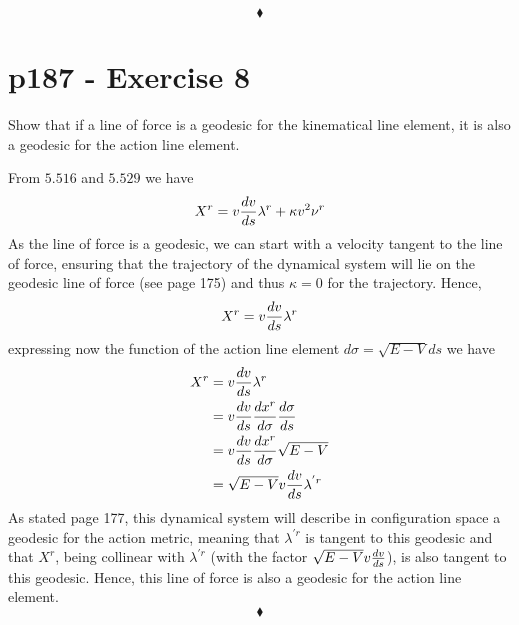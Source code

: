 $$\blacklozenge$$
\newpage


\section{p187 - Exercise 8}
\begin{tcolorbox}
Show that if a line of force is a geodesic for the kinematical line element, it is also a geodesic for the action line element.
\end{tcolorbox}
From $\mathbf{5.516}$ and  $\mathbf{5.529}$ we have
\begin{align}
X^r = v\dv{v}{s}\lambda^r +\kappa v^2\nu^r
\end{align}
As the line of force is a geodesic, we can start with a velocity tangent to the line of force, ensuring that the trajectory of the dynamical system will lie on the geodesic line of force (see page 175) and thus $\kappa=0$ for the trajectory. Hence,
\begin{align}
X^r = v\dv{v}{s}\lambda^r
\end{align}
expressing now the function of the action line element $d \sigma = \sqrt{E-V}ds $ we have 
\begin{align}
X^r &= v\dv{v}{s}\lambda^r\\
&= v\dv{v}{s}\dv{x^r}{\sigma}\dv{\sigma}{s}\\
&= v\dv{v}{s}\dv{x^r}{\sigma}\sqrt{E-V}\\
&= \sqrt{E-V}v\dv{v}{s}\lambda^{'r}
\end{align}
As stated page 177, this dynamical system will describe in configuration space a geodesic for the action metric, meaning that $\lambda^{'r}$ is tangent to this geodesic and that $X^r$, being collinear with $\lambda^{'r}$ (with the factor $\sqrt{E-V}v\dv{v}{s}$), is also tangent to this geodesic. Hence, this  line of force is also a geodesic for the action line element.
$$\blacklozenge$$
\newpage

